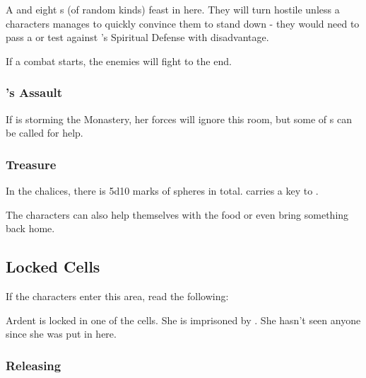A \enemyRevelerDrinking{} and eight \enemyCultist{}s (of random kinds) feast in here. They will turn hostile unless a characters manages to quickly convince them to stand down - they would need to pass a \skillDeception{} or \skillPersuasion{} test against \enemyRevelerMasked{}'s Spiritual Defense with disadvantage.

If a combat starts, the enemies will fight to the end.

\subsubsection{\npcHighmarshalName{}'s Assault}

If \npcHighmarshal{} is storming the Monastery, her forces will ignore this room, but some of \enemyWallGuard{}s can be called for help.

\subsubsection{Treasure}

In the chalices, there is 5d10 marks of spheres in total. \enemyRevelerDrinking{} carries a key to .

The characters can also help themselves with the food or even bring something back home.




\subsection{Locked Cells}
\label{sec:monasteryCells}

If the characters enter this area, read the following:


Ardent \npcLockedArdent[s]{} is locked in one of the cells. She is imprisoned by \npcFractionCult{}. She hasn't seen anyone since she was put in here.

\subsubsection{Releasing \npcLockedArdentName{}}

